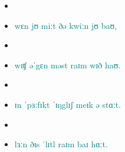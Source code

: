 \begin{itemize}
\item {}
\item \textcolor{teal}{wɛn jʊ miːt ðə kwiːn jʊ baʊ,}
\item {}
\item \textcolor{teal}{wɪʧ əˈgɛn məst raɪm wɪð haʊ.}
\item {}
\item \textcolor{teal}{ɪn ˈpɜːfɪkt ˈɪŋglɪʃ meɪk ə stɑːt.}
\item {}
\item \textcolor{teal}{lɜːn ðɪs ˈlɪtl raɪm baɪ hɑːt.}                    
\end{itemize}
